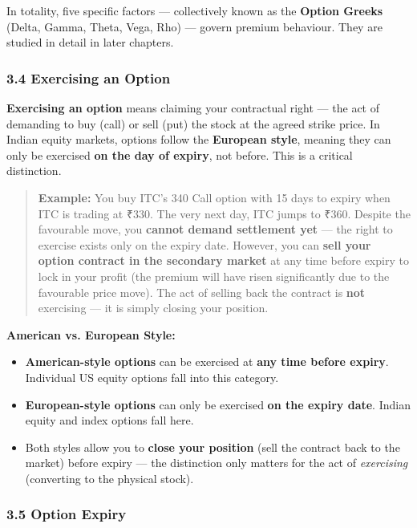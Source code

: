 \documentclass[12pt,openany]{book}
\begin{document}
In totality, five specific factors — collectively known as the \textbf{Option Greeks} (Delta, Gamma, Theta, Vega, Rho) — govern premium behaviour. They are studied in detail in later chapters.

\subsubsection{3.4 Exercising an Option}

\textbf{Exercising an option} means claiming your contractual right — the act of demanding to buy (call) or sell (put) the stock at the agreed strike price. In Indian equity markets, options follow the \textbf{European style}, meaning they can only be exercised \textbf{on the day of expiry}, not before. This is a critical distinction.

\begin{quote}
\textbf{Example:} You buy ITC's 340 Call option with 15 days to expiry when ITC is trading at ₹330. The very next day, ITC jumps to ₹360. Despite the favourable move, you \textbf{cannot demand settlement yet} — the right to exercise exists only on the expiry date. However, you can \textbf{sell your option contract in the secondary market} at any time before expiry to lock in your profit (the premium will have risen significantly due to the favourable price move). The act of selling back the contract is \textbf{not} exercising — it is simply closing your position.
\end{quote}

\textbf{American vs. European Style:}
\begin{itemize}[leftmargin=*]
    \item \textbf{American-style options} can be exercised at \textbf{any time before expiry}. Individual US equity options fall into this category.
    \item \textbf{European-style options} can only be exercised \textbf{on the expiry date}. Indian equity and index options fall here.
    \item Both styles allow you to \textbf{close your position} (sell the contract back to the market) before expiry — the distinction only matters for the act of \emph{exercising} (converting to the physical stock).
\end{itemize}

\subsubsection{3.5 Option Expiry}
\end{document}
